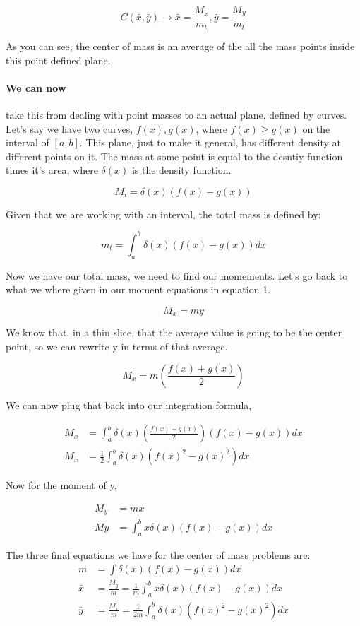 \begin{equation}
	C(\bar{x}, \bar{y}) \to \bar{x} = \frac{M_x}{m_t}, \bar{y} = \frac{M_y}{m_t}
\end{equation} 

As you can see, the center of mass is an average of the all the mass points inside this point defined plane. 

\paragraph {We can now} take this from dealing with point masses to an actual plane, defined by curves. 
Let's say we have two curves, $f(x), g(x)$, where $f(x) \geq g(x)$ on the interval of $[a, b]$. This plane, just to make it general, has different density at different points on it. The mass at some point is equal to the desntiy function times it's area, where $\delta(x)$ is the density function.

\begin{equation}
	M_i = \delta(x)(f(x)-g(x))
\end{equation}

Given that we are working with an interval, the total mass is defined by: 

\begin{equation}
	m_t = \int_a^b{\delta(x)(f(x)-g(x))} dx
\end{equation}

Now we have our total mass, we need to find our momements. Let's go back to what we where given in our moment equations in equation 1. 

\begin{equation*}
	M_x = my	
\end{equation*}

We know that, in a thin slice, that the average value is going to be the center point, so we can rewrite y in terms of that average. 

\begin{equation*}
	M_x = m (\frac{f(x)+g(x)}{2})
\end{equation*}

We can now plug that back into our integration formula,

\begin{align}
	M_x &= \int_a^b {\delta(x)(\frac{f(x)+g(x)}{2})(f(x)-g(x))}dx \\ 
	M_x &= \frac{1}{2}\int_a^b {\delta(x)(f(x)^2-g(x)^2)} dx
\end{align}

Now for the moment of y, 

\begin{align}
	M_y &= mx \\ 
	My  &= \int_a^b x\delta(x)(f(x)-g(x)) dx  
\end{align}

The three final equations we have for the center of mass problems are: 
\begin{align}
	m &= \int \delta(x) (f(x)-g(x)) dx\\
	\bar{x} &= \frac{M_y}{m} = \frac{1}{m}\int_a^b x\delta(x)(f(x)-g(x)) dx \\ 
	\bar{y} &= \frac{M_x}{m} = \frac{1}{2m} \int_a^b {\delta(x)(f(x)^2-g(x)^2)} dx 
\end{align}